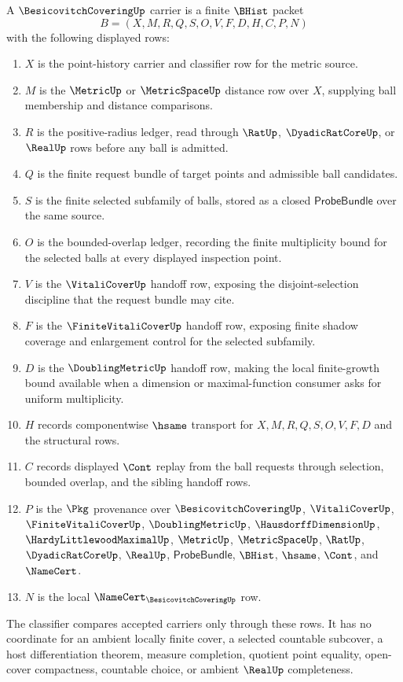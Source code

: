 \begin{definition}
\label{def:besicovitch-covering-carrier}
A $\BesicovitchCoveringUp$ carrier is a finite $\BHist$ packet
$$
B=(X,M,R,Q,S,O,V,F,D,H,C,P,N)
$$
with the following displayed rows:
\begin{enumerate}
\item $X$ is the point-history carrier and classifier row for the metric source.
\item $M$ is the $\MetricUp$ or $\MetricSpaceUp$ distance row over $X$, supplying ball membership and distance comparisons.
\item $R$ is the positive-radius ledger, read through $\RatUp$, $\DyadicRatCoreUp$, or $\RealUp$ rows before any ball is admitted.
\item $Q$ is the finite request bundle of target points and admissible ball candidates.
\item $S$ is the finite selected subfamily of balls, stored as a closed $\mathsf{ProbeBundle}$ over the same source.
\item $O$ is the bounded-overlap ledger, recording the finite multiplicity bound for the selected balls at every displayed inspection point.
\item $V$ is the $\VitaliCoverUp$ handoff row, exposing the disjoint-selection discipline that the request bundle may cite.
\item $F$ is the $\FiniteVitaliCoverUp$ handoff row, exposing finite shadow coverage and enlargement control for the selected subfamily.
\item $D$ is the $\DoublingMetricUp$ handoff row, making the local finite-growth bound available when a dimension or maximal-function consumer asks for uniform multiplicity.
\item $H$ records componentwise $\hsame$ transport for $X,M,R,Q,S,O,V,F,D$ and the structural rows.
\item $C$ records displayed $\Cont$ replay from the ball requests through selection, bounded overlap, and the sibling handoff rows.
\item $P$ is the $\Pkg$ provenance over $\BesicovitchCoveringUp$, $\VitaliCoverUp$, $\FiniteVitaliCoverUp$, $\DoublingMetricUp$, $\HausdorffDimensionUp$, $\HardyLittlewoodMaximalUp$, $\MetricUp$, $\MetricSpaceUp$, $\RatUp$, $\DyadicRatCoreUp$, $\RealUp$, $\mathsf{ProbeBundle}$, $\BHist$, $\hsame$, $\Cont$, and $\NameCert$.
\item $N$ is the local $\NameCert_{\BesicovitchCoveringUp}$ row.
\end{enumerate}
The classifier compares accepted carriers only through these rows. It has no coordinate for an ambient locally finite cover, a selected countable subcover, a host differentiation theorem, measure completion, quotient point equality, open-cover compactness, countable choice, or ambient $\RealUp$ completeness.
\end{definition}

